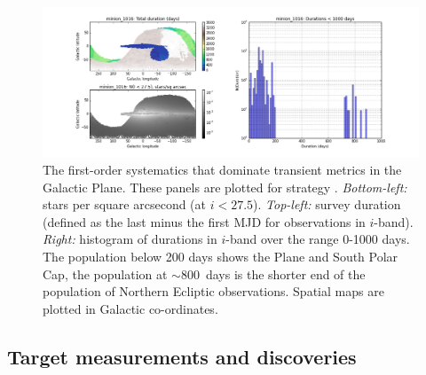 
\begin{figure}
    \includegraphics[width=6.0in]{./figs/milkyway/durations_minion_1016.png}
  \caption{The first-order systematics that dominate transient metrics in the Galactic Plane. These panels are plotted for strategy . {\it Bottom-left:} stars per square arcsecond (at $i < 27.5$). {\it Top-left:} survey duration (defined as the last minus the first MJD for observations in $i$-band). {\it Right:} histogram of durations in $i$-band over the range 0-1000 days. The population below 200 days shows the Plane and South Polar Cap, the population at $\sim 800$~days is the shorter end of the population of Northern Ecliptic observations. Spatial maps are plotted in Galactic co-ordinates.}
\label{fig_durationInGalacticCoords}
\end{figure}



\subsection{Target measurements and discoveries}
\label{sec:\secname:MW_Disk_targets}

